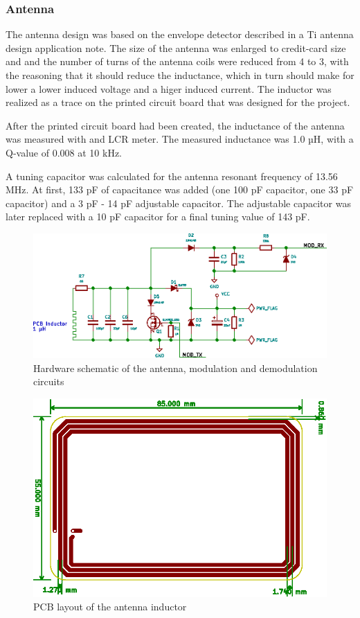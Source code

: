 \subsubsection{Antenna}
The antenna design was based on the envelope detector described in a Ti antenna design application note\cite{ti-antenna}.
The size of the antenna was enlarged to credit-card size and and the number of turns of the antenna coils were reduced from 4 to 3, with the reasoning that it should reduce the inductance, which in turn should make for lower a lower induced voltage and a higer induced current.
The inductor was realized as a trace on the printed circuit board that was designed for the project.

After the printed circuit board had been created, the inductance of the antenna was measured with and LCR meter.
The measured inductance was 1.0 µH, with a Q-value of 0.008 at 10 kHz.

A tuning capacitor was calculated for the antenna resonant frequency of 13.56 MHz.
At first, 133 pF of capacitance was added (one 100 pF capacitor, one 33 pF capacitor) and a 3 pF - 14 pF adjustable capacitor. The
adjustable capacitor was later replaced with a 10 pF capacitor for a final tuning value of 143 pF.

\begin{figure}[h!]
    \centering
    \includegraphics[scale=1.0]{res/schematic-antenna.eps}
    \caption{Hardware schematic of the antenna, modulation and demodulation circuits}
    \label{fig:sch-antenna}
\end{figure}

\begin{figure}[h!]
    \centering
    \includegraphics[scale=1.0]{res/softtag-brd-antenna.eps}
    \caption{PCB layout of the antenna inductor}
    \label{fig:brd-antenna}
\end{figure}

